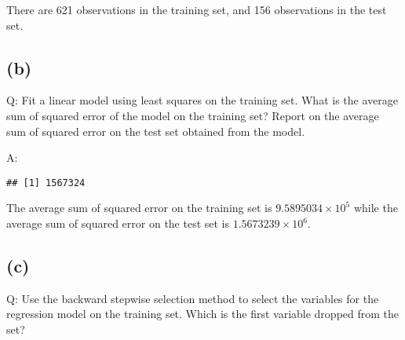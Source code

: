 \documentclass[
]{article}
\newenvironment{Shaded}{\begin{snugshade}}{\end{snugshade}}
\newcommand{\CommentTok}[1]{\textcolor[rgb]{0.56,0.35,0.01}{\textit{#1}}}
\newcommand{\DataTypeTok}[1]{\textcolor[rgb]{0.13,0.29,0.53}{#1}}
\newcommand{\DecValTok}[1]{\textcolor[rgb]{0.00,0.00,0.81}{#1}}
\newcommand{\KeywordTok}[1]{\textcolor[rgb]{0.13,0.29,0.53}{\textbf{#1}}}
\newcommand{\NormalTok}[1]{#1}
\newcommand{\OperatorTok}[1]{\textcolor[rgb]{0.81,0.36,0.00}{\textbf{#1}}}
\newcommand{\StringTok}[1]{\textcolor[rgb]{0.31,0.60,0.02}{#1}}
\begin{document}
There are 621 observations in the training set, and 156 observations in
the test set.

\hypertarget{fourb}{%
\subsection{(b)}\label{fourb}}

Q: Fit a linear model using least squares on the training set. What is
the average sum of squared error of the model on the training set?
Report on the average sum of squared error on the test set obtained from
the model.

A:

\begin{Shaded}
\end{Shaded}

\begin{verbatim}
## [1] 1567324
\end{verbatim}

The average sum of squared error on the training set is
\ensuremath{9.5895034\times 10^{5}} while the average sum of squared
error on the test set is \ensuremath{1.5673239\times 10^{6}}.

\hypertarget{c-2}{%
\subsection{(c)}\label{c-2}}

Q: Use the backward stepwise selection method to select the variables
for the regression model on the training set. Which is the first
variable dropped from the set?
\end{document}
